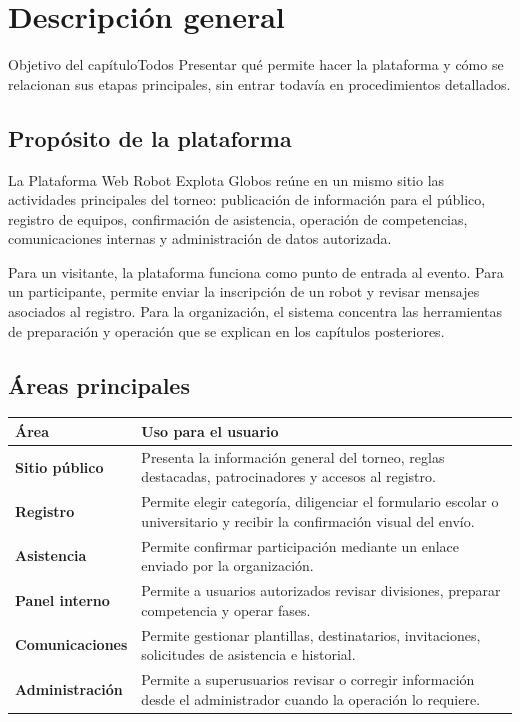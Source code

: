 \chapter{Descripción general}

\begin{procedimiento}{Objetivo del capítulo}{Todos}
Presentar qué permite hacer la plataforma y cómo se relacionan sus etapas principales, sin entrar todavía en procedimientos detallados.
\end{procedimiento}

\section{Propósito de la plataforma}

La Plataforma Web Robot Explota Globos reúne en un mismo sitio las actividades principales del torneo: publicación de información para el público, registro de equipos, confirmación de asistencia, operación de competencias, comunicaciones internas y administración de datos autorizada.

Para un visitante, la plataforma funciona como punto de entrada al evento. Para un participante, permite enviar la inscripción de un robot y revisar mensajes asociados al registro. Para la organización, el sistema concentra las herramientas de preparación y operación que se explican en los capítulos posteriores.


\section{Áreas principales}

\begin{tabularx}{\linewidth}{>{\bfseries}p{3.2cm}X}
\toprule
Área & Uso para el usuario\\
\midrule
Sitio público & Presenta la información general del torneo, reglas destacadas, patrocinadores y accesos al registro.\\
Registro & Permite elegir categoría, diligenciar el formulario escolar o universitario y recibir la confirmación visual del envío.\\
Asistencia & Permite confirmar participación mediante un enlace enviado por la organización.\\
Panel interno & Permite a usuarios autorizados revisar divisiones, preparar competencia y operar fases.\\
Comunicaciones & Permite gestionar plantillas, destinatarios, invitaciones, solicitudes de asistencia e historial.\\
Administración & Permite a superusuarios revisar o corregir información desde el administrador cuando la operación lo requiere.\\
\bottomrule
\end{tabularx}

